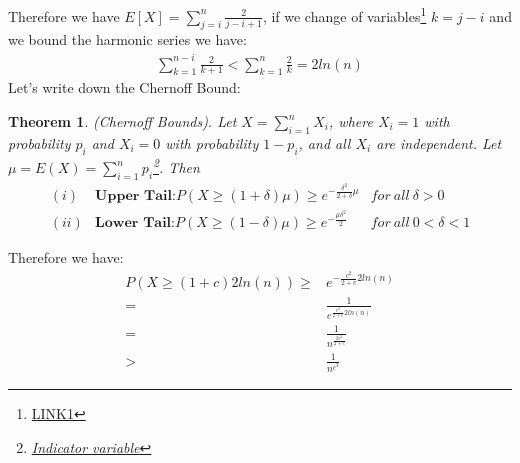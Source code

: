 \documentclass[a4paper]{article}
\newtheorem{theorem}{Theorem}
\begin{document}
Therefore we have $E[X]= \sum_{j=i}^n \frac{2}{j-i+1}$, if we change of variables\footnote{\href{http://math.stackexchange.com/questions/342061/double-summation-index-change-clarification}{LINK1}} $k= j-i$ and we bound the harmonic series we have:
\begin{align*}
\sum_{k=1}^{n-i} \frac{2}{k+1} < \sum_{k=1}^{n} \frac{2}{k}= 2 ln(n)
\end{align*}
Let's write down the Chernoff Bound:
\begin{theorem}
(Chernoff Bounds). Let $X=\sum_{i=1}^n X_{i}$, where $X_i = 1$ with probability $p_i$ and $X_i = 0$ with probability $1 − p_i$, and all $X_i$ are independent. Let $\mu = E(X) = \sum_{i=1}^n p_i$\footnote{\href{http://heather.cs.ucdavis.edu/~matloff/132/GenderExample.pdf}{Indicator variable}}. Then
\begin{align*}
(i) &\textbf{Upper Tail:} P(X \geq (1 + \delta)\mu) \geq e^{-\frac{\delta^2}{2+\delta}\mu} &for \ all \ \delta > 0 \\
(ii) &\textbf{Lower Tail:} P(X \geq (1 - \delta)\mu) \geq e^{-\frac{\mu\delta^2}{2}}      &for \ all \ 0< \delta < 1 
\end{align*}
\end{theorem}
Therefore we have:
\begin{align*}
P(X \geq (1 + c)2ln(n))\geq & e^{-\frac{c^2}{2+c}2ln(n)} \\
						=   & \frac{1}{e^{\frac{c^2}{2+c}2ln(n)}}\\
						=   & \frac{1}{n^{\frac{2c^2}{2+c}}}\\
						>   & \frac{1}{n^{c^3}}
\end{align*}
\end{document}
